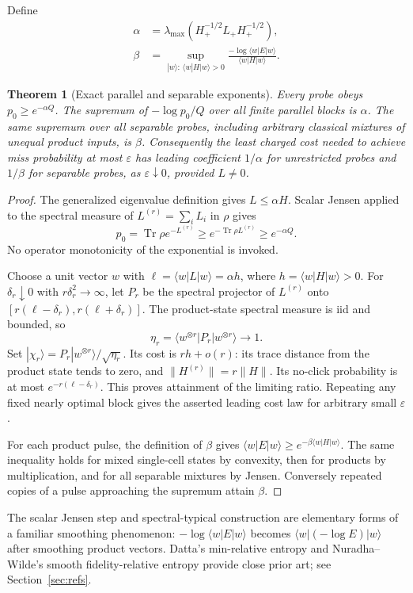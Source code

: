\documentclass[11pt]{article}
\newtheorem{theorem}{Theorem}[section]
\newcommand{\Tr}{\operatorname{Tr}}
\newcommand{\ket}[1]{|#1\rangle}
\newcommand{\bra}[1]{\langle#1|}
\begin{document}
Define
\begin{align*}
 \alpha&=\lambda_{\max}(H_+^{-1/2}L_+H_+^{-1/2}),\\
 \beta&=\sup_{\ket w:\,\bra wH\ket w>0}
 \frac{-\log\bra wE\ket w}{\bra wH\ket w}.
\end{align*}
\begin{theorem}[Exact parallel and separable exponents]\label{thm:exponent}
Every probe obeys $p_0\geq e^{-\alpha Q}$. The supremum of $-\log p_0/Q$ over all finite parallel blocks is $\alpha$. The same supremum over all separable probes, including arbitrary classical mixtures of unequal product inputs, is $\beta$. Consequently the least charged cost needed to achieve miss probability at most $\varepsilon$ has leading coefficient $1/\alpha$ for unrestricted probes and $1/\beta$ for separable probes, as $\varepsilon\downarrow0$, provided $L\ne0$.
\end{theorem}
\begin{proof}
The generalized eigenvalue definition gives $L\leq\alpha H$. Scalar Jensen applied to the spectral measure of $L^{(r)}=\sum_i L_i$ in $\rho$ gives
\[
 p_0=\Tr\rho e^{-L^{(r)}}\geq
 e^{-\Tr\rho L^{(r)}}\geq e^{-\alpha Q}.
\]
No operator monotonicity of the exponential is invoked.

Choose a unit vector $w$ with $\ell=\bra wL\ket w=\alpha h$, where $h=\bra wH\ket w>0$. For $\delta_r\downarrow0$ with $r\delta_r^2\to\infty$, let $P_r$ be the spectral projector of $L^{(r)}$ onto $[r(\ell-\delta_r),r(\ell+\delta_r)]$. The product-state spectral measure is iid and bounded, so
\[
 \eta_r=\bra{w^{\otimes r}}P_r\ket{w^{\otimes r}}\longrightarrow1.
\]
Set $\ket{\chi_r}=P_r\ket{w^{\otimes r}}/\sqrt{\eta_r}$. Its cost is $rh+o(r)$: its trace distance from the product state tends to zero, and $\|H^{(r)}\|=r\|H\|$. Its no-click probability is at most $e^{-r(\ell-\delta_r)}$. This proves attainment of the limiting ratio. Repeating any fixed nearly optimal block gives the asserted leading cost law for arbitrary small $\varepsilon$.

For each product pulse, the definition of $\beta$ gives $\bra wE\ket w\geq e^{-\beta\bra wH\ket w}$. The same inequality holds for mixed single-cell states by convexity, then for products by multiplication, and for all separable mixtures by Jensen. Conversely repeated copies of a pulse approaching the supremum attain $\beta$.
\end{proof}

The scalar Jensen step and spectral-typical construction are elementary forms of a familiar smoothing phenomenon: $-\log\bra wE\ket w$ becomes $\bra w(-\log E)\ket w$ after smoothing product vectors. Datta's min-relative entropy and Nuradha--Wilde's smooth fidelity-relative entropy provide close prior art; see Section~\ref{sec:refs}.
\end{document}

